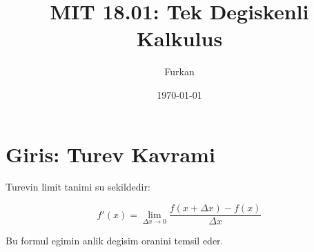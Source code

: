 \documentclass{article}
\title{MIT 18.01: Tek Degiskenli Kalkulus}
\author{Furkan}
\date{\today}
\begin{document}
\maketitle

\section{Giris: Turev Kavrami}
Turevin limit tanimi su sekildedir:

\begin{equation}
    f'(x) = \lim_{\Delta x \to 0} \frac{f(x + \Delta x) - f(x)}{\Delta x}
\end{equation}

Bu formul egimin anlik degisim oranini temsil eder.
\end{document}

